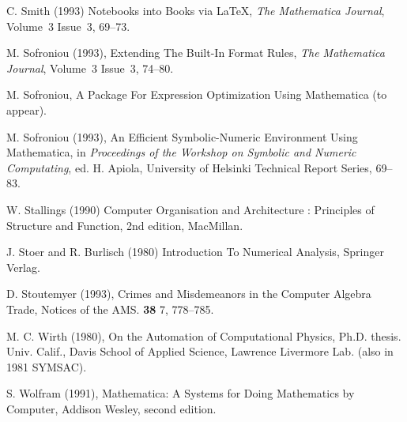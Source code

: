 \documentclass [12pt,twoside]{article}
\begin{document}
\begin{thebibliography}{999}
 C. Smith (1993) Notebooks into Books via \LaTeX,
{\it The Mathematica Journal}, Volume~3 Issue~3, 69--73.

 M. Sofroniou (1993), Extending The Built-In Format
Rules, {\it The Mathematica Journal}, Volume~3 Issue~3, 74--80.

 M. Sofroniou, A Package For Expression Optimization
Using Mathematica (to appear).

 M. Sofroniou (1993), An Efficient Symbolic-Numeric
Environment Using Mathematica, in {\it Proceedings of the Workshop on
Symbolic and Numeric Computating}, ed. H. Apiola, University of
Helsinki Technical Report Series, 69--83.

 W. Stallings (1990) Computer Organisation and
Architecture : Principles of Structure and Function, 2nd edition,
MacMillan.

 J. Stoer and R. Burlisch (1980) Introduction To
Numerical Analysis, Springer Verlag.

 D. Stoutemyer (1993), Crimes and Misdemeanors in the Computer
Algebra Trade, Notices of the AMS. {\bf 38} 7, 778--785.

 M. C. Wirth (1980), On the Automation of Computational
Physics, Ph.D. thesis. Univ. Calif., Davis School of Applied Science, Lawrence
Livermore Lab. (also in 1981 SYMSAC).

 S. Wolfram (1991), Mathematica: A Systems for Doing
Mathematics by Computer, Addison Wesley, second edition.

\end{thebibliography}
\end{document}
